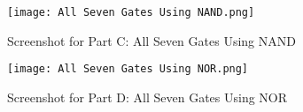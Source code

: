 \documentclass[a4paper,12pt]{article}
\begin{document}
\begin{figure}[h]
    \centering
    \texttt{[image: All Seven Gates Using NAND.png]} %
    \caption{Screenshot for Part C: All Seven Gates Using NAND}
\end{figure}

\begin{figure}[h]
    \centering
    \texttt{[image: All Seven Gates Using NOR.png]} %
    \caption{Screenshot for Part D: All Seven Gates Using NOR}
\end{figure}
\end{document}
